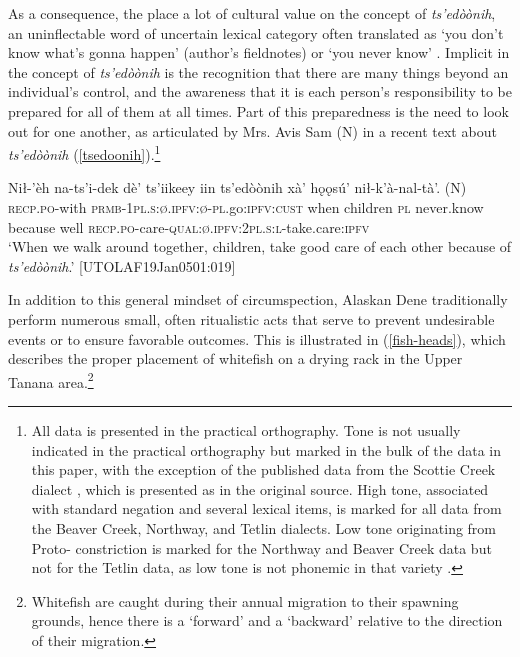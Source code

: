 \documentclass[output=paper,colorlinks,citecolor=brown]{langscibook}
\begin{document}
As a consequence, the  place a lot of cultural value on the concept of \textit{ts'edòònih}, an uninflectable word of uncertain lexical category often translated as `you don't know what's gonna happen' (author's fieldnotes) or `you never know' \citep{KariJ1997stem}.  Implicit in the concept of \textit{ts'edòònih} is the recognition that there are many things beyond an individual's control, and the awareness that it is each person's responsibility to be prepared for all of them at all times. Part of this preparedness is the need to look out for one another, as articulated by Mrs. Avis Sam (N) in a recent text about \textit{ts'edòònih} (\ref{tsedoonih}).\footnote{All data is presented in the practical orthography. Tone is not usually indicated in the practical orthography but marked in the bulk of the data in this paper, with the exception of the published data from the Scottie Creek dialect \citep{TyoneM1996}, which is presented as in the original source. High tone, associated with standard negation and several lexical items, is marked for all data from the Beaver Creek, Northway, and Tetlin dialects. Low tone originating from Proto- constriction \citep{KraussM2005} is marked for the Northway and Beaver Creek data but not for the Tetlin data, as low tone is not phonemic in that variety \citep{MinouraN1994, LovickO2020}.}

\ea 
\label{tsedoonih}
\gll Nił-'èh na-ts'i-dek dè' ts'iikeey iin ts'edòònih xà' hǫǫsú' {nił-k'à-nal-tà'. \textnormal{(N)}} \\
\textsc{recp.po}-with \textsc{prmb-1pl.s:ø.ipfv:ø-pl}.go:\textsc{ipfv:cust} when children \textsc{pl} never.know because well \textsc{recp.po}-care-\textsc{qual:ø.ipfv:2pl.s:l}-take.care:\textsc{ipfv} \\
\glt `When we walk around together, children, take good care of each other because of \textit{ts'edòònih}.' \hfill [UTOLAF19Jan0501:019]\\
\z

In addition to this general mindset of circumspection, Alaskan Dene traditionally perform numerous small, often ritualistic acts that serve to prevent undesirable events or to ensure favorable outcomes. This is illustrated in (\ref{fish-heads}), which describes the proper placement of whitefish on a drying rack in the Upper Tanana area.\footnote{Whitefish are caught during their annual migration to their spawning grounds, hence there is a `forward' and a `backward' relative to the direction of their migration.} 
\end{document}
